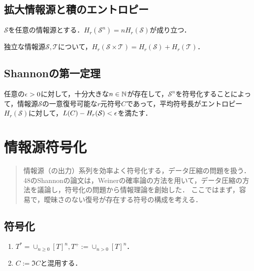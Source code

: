 \documentclass[uplatex,dvipdfmx]{jsreport}
\renewcommand{\S}{\mathcal{S}}
\renewcommand{\T}{\mathcal{T}}
\begin{document}
\section{拡大情報源と積のエントロピー}

\begin{theorem}
    $\S$を任意の情報源とする．$H_r(\S^n)=nH_r(\S)$が成り立つ．
\end{theorem}

\begin{theorem}
    独立な情報源$\S,\T$について，$H_r(\S\times\T)=H_r(\S)+H_r(\T)$．
\end{theorem}

\section{Shannonの第一定理}

\begin{theorem}
    任意の$\epsilon>0$に対して，十分大きな$n\in\mathbb{N}$が存在して，$\S^n$を符号化することによって，情報源$\S$の一意復号可能な$r$元符号$C$であって，平均符号長がエントロピー$H_r(\S)$に対して，$L(C)-H_r(\S)<\ep$を満たす．
\end{theorem}

\chapter{情報源符号化}

\begin{quotation}
    情報源（の出力）系列を効率よく符号化する，データ圧縮の問題を扱う．
    48のShannonの論文は，Weinerの確率論の方法を用いて，データ圧縮の方法を議論し，符号化の問題から情報理論を創始した．
    ここではまず，容易で，曖昧さのない復号が存在する符号の構成を考える．
\end{quotation}

\section{符号化}

\begin{notation}\mbox{}
    \begin{enumerate}
        \item $T^*=\cup_{n\ge0}[T]^n,T^+:=\cup_{n>0}[T]^n$．
        \item $C:=\Im C$と混用する．
    \end{enumerate}
\end{notation}
\end{document}
